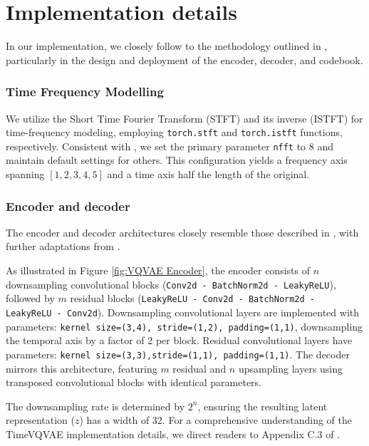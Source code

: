 \documentclass[../../thesis.tex]{subfiles}
\begin{document}
\section{Implementation details}

In our implementation, we closely follow to the methodology outlined in \cite{TimeVQVAE}, particularly in the design and deployment of the encoder, decoder, and codebook.

\subsubsection{Time Frequency Modelling}
We utilize the Short Time Fourier Transform (STFT) and its inverse (ISTFT) for time-frequency modeling, employing \texttt{torch.stft} and \texttt{torch.istft} functions, respectively. Consistent with \cite{TimeVQVAE}, we set the primary parameter \texttt{nfft} to 8 and maintain default settings for others. This configuration yields a frequency axis spanning $[1, 2, 3, 4, 5]$ and a time axis half the length of the original.

\subsubsection{Encoder and decoder}

The encoder and decoder architectures closely resemble those described in \cite{nadavbh12}, with further adaptations from \cite{TimeVQVAE}.\newline

As illustrated in Figure \ref{fig:VQVAE Encoder}, the encoder consists of $n$ downsampling convolutional blocks (\texttt{Conv2d - BatchNorm2d - LeakyReLU}), followed by $m$ residual blocks (\texttt{LeakyReLU - Conv2d - BatchNorm2d - LeakyReLU - Conv2d}). Downsampling convolutional layers are implemented with parameters: \texttt{kernel size=(3,4), stride=(1,2), padding=(1,1)}, downsampling the temporal axis by a factor of 2 per block. Residual convolutional layers have parameters: \texttt{kernel size=(3,3),stride=(1,1), padding=(1,1)}. The decoder mirrors this architecture, featuring $m$ residual and $n$ upsampling layers using transposed convolutional blocks with identical parameters.\newline

The downsampling rate is determined by $2^n$, ensuring the resulting latent representation ($z$) has a width of 32. For a comprehensive understanding of the TimeVQVAE implementation details, we direct readers to Appendix C.3 of \cite{TimeVQVAE}.
\end{document}
